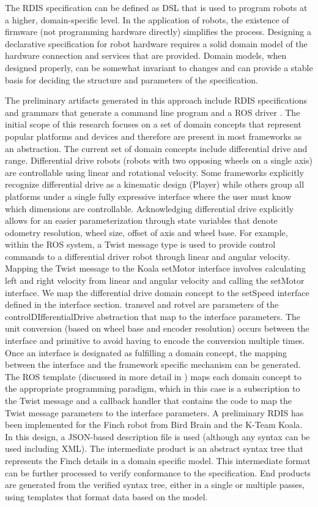 The RDIS specification can be defined as DSL that is used to program robots at a higher, domain-specific level.  In the application of robots, the existence of firmware (not programming hardware directly) simplifies the process.  Designing a declarative specification for robot hardware requires a solid domain model of the hardware connection and services that are provided.  Domain models, when designed properly, can be somewhat invariant to changes and can provide a stable basis for deciding the structure and parameters of the specification.  %

The preliminary artifacts generated in this approach include RDIS specifications and grammars that generate a command line program and a ROS driver \monica{[reference?]}.  The initial scope of this research focuses on a set of domain concepts that represent popular platforms and devices and therefore are present in most frameworks as an abstraction.   The current set of domain concepts include {\sc differential drive} and {\sc range}.   Differential drive robots (robots with two opposing wheels on a single axis) are controllable using linear and rotational velocity.   Some frameworks explicitly recognize differential drive as a kinematic design (Player) while others group all platforms under a single fully expressive interface where the user must know which dimensions are controllable.  Acknowledging differential drive explicitly allows for an easier parameterization through state variables that denote odometry resolution, wheel size, offset of axis and wheel base.  For example, within the ROS system, a {\sc Twist} message type is used to provide control commands to a differential driver robot through linear and angular velocity.  Mapping the {\sc Twist} message to the Koala {\sc setMotor} interface involves calculating left and right velocity from linear and angular velocity and calling the {\sc setMotor} interface.  We map the differential drive domain concept to the {\sc setSpeed} interface defined in the interface section.   {\sc transvel} and {\sc rotvel} are parameters of the controlDIfferentialDrive abstraction that map to the interface parameters.  The unit conversion (based on wheel base and encoder resolution) occurs between the interface and primitive to avoid having to encode the conversion multiple times.  Once an interface is designated as fulfilling a domain concept, the mapping between the interface and the framework specific mechanism can be generated.  The ROS template (discussed in more detail in \cite{Anderson2012}) maps each domain concept to the appropriate programming paradigm, which in this case is a subscription to the {\sc Twist} message and a callback handler that contains the code to map the {\sc Twist} message parameters to the interface parameters.   A preliminary RDIS has been implemented for the Finch robot from Bird Brain and the K-Team Koala\cite{Anderson2012}.  In this design, a JSON-based description file is used (although any syntax can be used including XML).  The intermediate product is an abstract syntax tree that represents the Finch details in a domain specific model.  This intermediate format can be further processed to verify conformance to the specification.  End products are generated from the verified syntax tree, either in a single or multiple passes, using templates that format data based on the model. 


